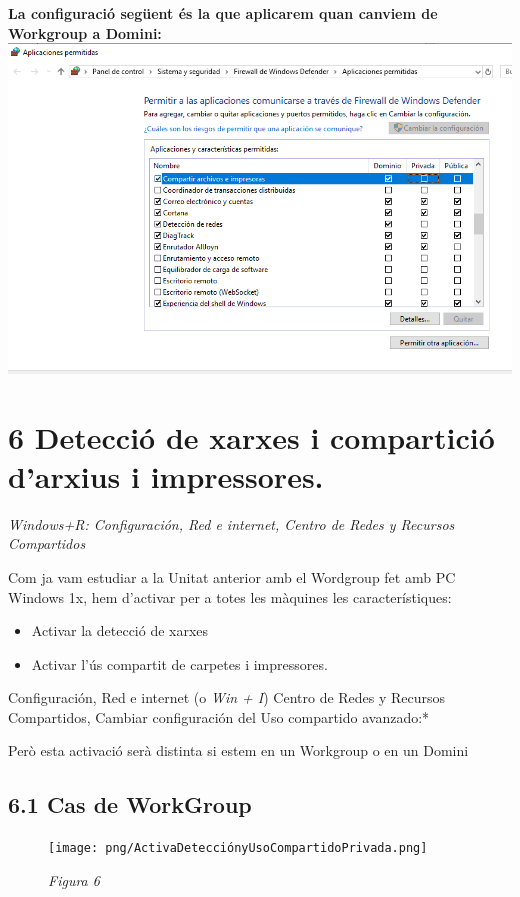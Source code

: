 \documentclass[
  a4paper,
]{article}
\begin{document}
\textbf{La configuració següent és la que aplicarem quan canviem de
Workgroup a Domini:} \includegraphics{png/FirewallAplicacionesAD.png}

\section{6 Detecció de xarxes i compartició d'arxius i
impressores.}\label{detecciuxf3-de-xarxes-i-comparticiuxf3-darxius-i-impressores.}

\emph{Windows+R: Configuración, Red e internet, Centro de Redes y
Recursos Compartidos}

Com ja vam estudiar a la Unitat anterior amb el Wordgroup fet amb PC
Windows 1x, hem d'activar per a totes les màquines les característiques:

\begin{itemize}
\item
  Activar la detecció de xarxes
\item
  Activar l'ús compartit de carpetes i impressores.
\end{itemize}

Configuración, Red e internet (o \emph{Win + I}) Centro de Redes y
Recursos Compartidos, Cambiar configuración del Uso compartido
avanzado:*

Però esta activació serà distinta si estem en un Workgroup o en un
Domini

\subsection{6.1 Cas de WorkGroup}\label{cas-de-workgroup}

\begin{figure}
\centering
\texttt{[image: png/ActivaDetecciónyUsoCompartidoPrivada.png]}
\caption{\emph{Figura 6}}
\end{figure}
\end{document}
